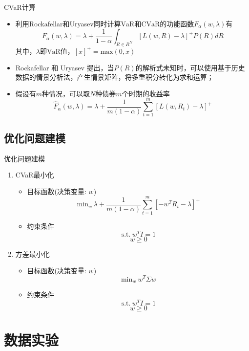 \documentclass[CJK,aspectratio=43]{beamer}  %
\begin{document}
\begin{frame}{CVaR计算}
	\begin{itemize}
		\item 利用Rockafellar和Uryasev同时计算$\text{VaR}$和$\text{CVaR}$的功能函数$F_{\alpha}(w,\lambda)$有
		$$
		F_{\alpha}(w,\lambda)=\lambda+\frac{1}{1-\alpha}\int_{R\in R^N}[L(w,R)-\lambda]^{+}P(R)dR
		$$
		其中，$\lambda$即$\text{VaR}$值，$[x]^{+} = \text{max}(0,x)$
		\item Rockafellar 和 Uryasev 提出，当$P(R)$的解析式未知时，可以使用基于历史数据的情景分析法，产生情景矩阵，将多重积分转化为求和运算；
		\item 假设有$m$种情况，可以取$N$种债券$m$个时期的收益率~\cite{Rong2007}
		$$
		\widehat{F}_{\alpha}(w,\lambda)=\lambda+\frac{1}{m(1-\alpha)}\sum_{t=1}^{m}[L(w,R_t)-\lambda]^{+}
		$$
	\end{itemize}
\end{frame}

\subsection{优化问题建模}
\begin{frame}{优化问题建模}
	\begin{enumerate}
	\item CVaR最小化
		\begin{itemize}	
			\item 目标函数(决策变量: $w$)  \\
			$$
			\text{min}_{w} \ \lambda+\frac{1}{m(1-\alpha)}\sum_{t=1}^{m}[-w^TR_t-\lambda]^{+}
			$$
			\item 约束条件 \\
			$$
			\text{s.t.} \ w^TI=1
			$$
			$$
			w \geq 0
			$$
		\end{itemize}
	\item 方差最小化
		\begin{itemize}	
			\item 目标函数(决策变量: $w$) \\
			$$
			\text{min}_{w} \ w^T\Sigma w
			$$
			\item 约束条件 \\
			$$
			\text{s.t.} \ w^TI=1
			$$
			$$
			w \geq 0
			$$
		\end{itemize}
	\end{enumerate}
\end{frame}

\section{数据实验}
\end{document}
